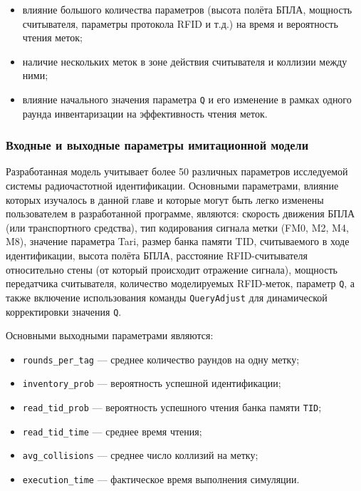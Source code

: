 \documentclass[12pt]{article}
\theoremstyle{definition}
\begin{document}
\begin{itemize}
    \item влияние большого количества параметров (высота полёта БПЛА, мощность считывателя, параметры протокола RFID и т.д.) на время и вероятность чтения меток;
    \item наличие нескольких меток в зоне действия считывателя и коллизии между ними;
    \item влияние начального значения параметра \texttt{Q} и его изменение в рамках одного раунда инвентаризации на эффективность чтения меток.
\end{itemize}

\subsubsection{Входные и выходные параметры имитационной модели}

Разработанная модель учитывает более 50 различных параметров исследуемой системы радиочастотной идентификации. Основными параметрами, влияние которых изучалось в данной главе и которые могут быть легко изменены пользователем в разработанной программе, являются: скорость движения БПЛА (или транспортного средства), тип кодирования сигнала метки (FM0, M2, M4, M8), значение параметра Tari, размер банка памяти TID, считываемого в ходе идентификации, высота полёта БПЛА, расстояние RFID-считывателя относительно стены (от который происходит отражение сигнала), мощность передатчика считывателя, количество моделируемых RFID-меток, параметр \texttt{Q}, а также включение использования команды \texttt{QueryAdjust} для динамической корректировки значения \texttt{Q}. 

Основными выходными параметрами являются:

\begin{itemize}
  \item \texttt{rounds\_per\_tag} — среднее количество раундов на одну метку;
  \item \texttt{inventory\_prob} — вероятность успешной идентификации;
  \item \texttt{read\_tid\_prob} — вероятность успешного чтения банка памяти \texttt{TID};
  \item \texttt{read\_tid\_time} — среднее время чтения;
  \item \texttt{avg\_collisions} — среднее число коллизий на метку;
  \item \texttt{execution\_time} — фактическое время выполнения симуляции.
\end{itemize}
\end{document}
